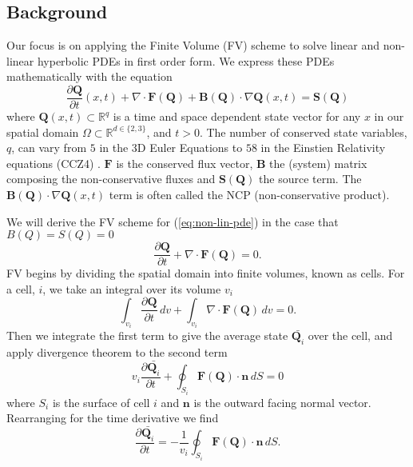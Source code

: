 \subsection{Background}
Our focus is on applying the Finite Volume (FV) scheme to solve linear and non-linear hyperbolic PDEs in first order form.
We express these PDEs mathematically with the equation
\begin{equation}\label{eq:non-lin-pde}
    \frac{\partial \mathbf{Q}}{\partial t}(x,t) + \nabla \cdot \mathbf{F}(\mathbf{Q}) + \mathbf{B}(\mathbf{Q}) \cdot \nabla \mathbf{Q}(x,t) = \mathbf{S}(\mathbf{Q})
\end{equation}
where $\mathbf{Q}(x,t)\subset \mathbb{R}^q$ is a time and space dependent state vector for any $x$ in our spatial domain $\Omega\subset \mathbb{R}^{d \in \{2,3\}}$, and $t>0$.
The number of conserved state variables, $q$, can vary from $5$ in the 3D Euler Equations to $58$ in the Einstien Relativity equations (CCZ4) \cite{CCZ4}.
$\mathbf{F}$ is the conserved flux vector, $\mathbf{B}$ the (system) matrix composing the non-conservative fluxes and $\mathbf{S}(\mathbf{Q})$ the source term.
The $\mathbf{B}(\mathbf{Q}) \cdot \nabla \mathbf{Q}(x,t)$ term is often called the NCP (non-conservative product).


We will derive the FV scheme for  (\ref{eq:non-lin-pde}) in the case that $B(Q)=S(Q)=0$
\begin{equation*}
    \frac{\partial \mathbf{Q}}{\partial t} + \nabla\cdot \mathbf{F}(\mathbf{Q}) = 0.
\end{equation*}
FV begins by dividing the spatial domain into finite volumes, known as cells.
For a cell, $i$, we take an integral over its volume $v_i$
\begin{equation*}
    \int_{v_i}\frac{\partial \mathbf{Q}}{\partial t}\,dv + \int_{v_i}\nabla\cdot \mathbf{F}(\mathbf{Q})\,dv = 0.
\end{equation*}
Then we integrate the first term to give the average state $\bar{\mathbf{Q}_i}$ over the cell, and apply divergence theorem to the second term
\begin{equation}
    v_i\frac{\partial \bar{\mathbf{Q}_i}}{\partial t} + \oint_{S_i}\mathbf{F}(\mathbf{Q})\cdot \mathbf{n} \, dS = 0
\end{equation}
where $S_i$ is the surface of cell $i$ and $\mathbf{n}$ is the outward facing normal vector.
Rearranging for the time derivative we find
\begin{equation}\label{eq:fv-done}
   \frac{\partial \bar{\mathbf{Q}_i}}{\partial t} = -\frac{1}{v_i} \oint_{S_i}\mathbf{F}(\mathbf{Q})\cdot \mathbf{n} \, dS.
\end{equation}

